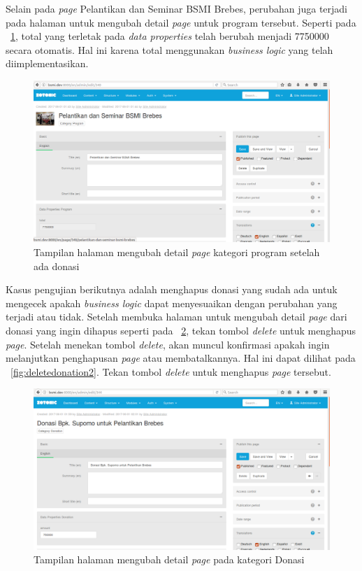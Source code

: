 Selain pada \textit{page} Pelantikan dan Seminar BSMI Brebes, perubahan juga terjadi pada halaman untuk mengubah detail \textit{page} untuk program tersebut. Seperti pada \pic~\ref{fig:editprogramafter}, total yang terletak pada \textit{data properties} telah berubah menjadi 7750000 secara otomatis. Hal ini karena total menggunakan \textit{business logic} yang telah diimplementasikan.
\begin{figure}
	\centering
	\includegraphics[width=1\textwidth]
	{pics/20-editProgramAfter.png}
	\caption{Tampilan halaman mengubah detail \textit{page} kategori program setelah ada donasi}
	\label{fig:editprogramafter}
\end{figure}
\vspace{-0.3cm}

Kasus pengujian berikutnya adalah menghapus donasi yang sudah ada untuk mengecek apakah \textit{business logic} dapat menyesuaikan dengan perubahan yang terjadi atau tidak. Setelah membuka halaman untuk mengubah detail \textit{page} dari donasi yang ingin dihapus seperti pada \pic~\ref{fig:deletedonation}, tekan tombol \textit{delete} untuk menghapus \textit{page}. Setelah menekan tombol \textit{delete}, akan muncul konfirmasi apakah ingin melanjutkan penghapusan \textit{page} atau membatalkannya. Hal ini dapat dilihat pada \pic~\ref{fig:deletedonation2}. Tekan tombol \textit{delete} untuk menghapus \textit{page} tersebut.
\begin{figure}
	\centering
	\includegraphics[width=1\textwidth]
	{pics/22-deleteDonation.png}
	\caption{Tampilan halaman mengubah detail \textit{page} pada kategori Donasi}
	\label{fig:deletedonation}
\end{figure}
\vspace{-0.3cm}

